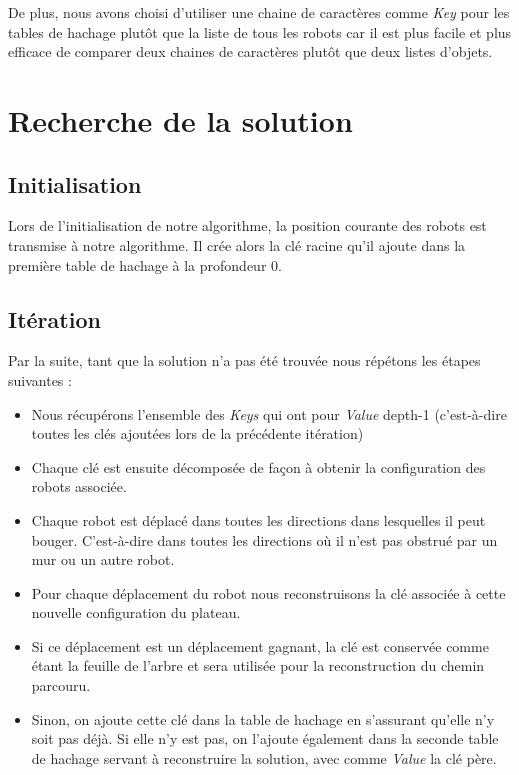 De plus, nous avons choisi d'utiliser une chaine de caractères comme \emph{Key} pour les tables de hachage plutôt que la liste de tous les robots car il est plus facile et plus efficace de comparer deux chaines de caractères plutôt que deux listes d'objets.

\section{Recherche de la solution}

\subsection{Initialisation}
Lors de l'initialisation de notre algorithme, la position courante des robots est transmise à notre algorithme. Il crée alors la clé racine qu'il ajoute dans la première table de hachage à la profondeur 0.

\subsection{Itération}
Par la suite, tant que la solution n'a pas été trouvée nous répétons les étapes suivantes :

\begin{itemize}
\item Nous récupérons l'ensemble des \emph{Keys} qui ont pour \emph{Value} depth-1 (c'est-à-dire toutes les clés ajoutées lors de la précédente itération)

\item Chaque clé est ensuite décomposée de façon à obtenir la configuration des robots associée.

\item Chaque robot est déplacé dans toutes les directions dans lesquelles il peut bouger. C'est-à-dire dans toutes les directions où il n'est pas obstrué par un mur ou un autre robot.

\item Pour chaque déplacement du robot nous reconstruisons la clé associée à cette nouvelle configuration du plateau.

\item Si ce déplacement est un déplacement gagnant, la clé est conservée comme étant la feuille de l'arbre et sera utilisée pour la reconstruction du chemin parcouru.

\item Sinon, on ajoute cette clé dans la table de hachage en s'assurant qu'elle n'y soit pas déjà. Si elle n'y est pas, on l'ajoute également dans la seconde table de hachage servant à reconstruire la solution, avec comme \emph{Value} la clé père.
\end{itemize}

